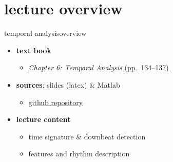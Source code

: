 

\subtitle{Part 7.2: Temporal Analysis}


	

    \section[overview]{lecture overview}
        \begin{frame}{temporal analysis}{overview}
            \begin{itemize}
                \item   \textbf{text book}  
                    \begin{itemize}
                        \item   \href{http://ieeexplore.ieee.org/xpl/articleDetails.jsp?tp=&arnumber=6331123&}{\underline{\textit{Chapter 6: Temporal Analysis} (pp.~134--137)}}
                    \end{itemize}
                \item   \textbf{sources}: slides (latex) \& Matlab  
                    \begin{itemize}
                        \item   \href{https://github.com/alexanderlerch/ACA-Slides}{\underline{github repository}}
                    \end{itemize}
                \bigskip
                \item<2->   \textbf{lecture content}
                    \begin{itemize}
                        \item<2->   time signature \& downbeat detection
                        \item<3->   features and rhythm description
                    \end{itemize}
            \end{itemize}
        \end{frame}


